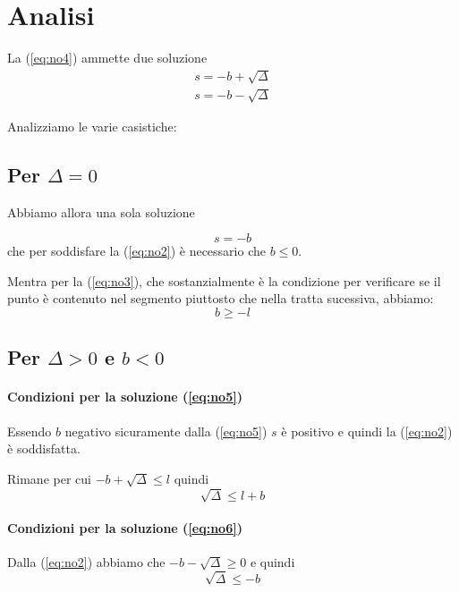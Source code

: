 \section{Analisi}

La (\ref{eq:no4}) ammette due soluzione
\begin{eqnarray}
  \label{eq:no5}
  s=-b+\sqrt\Delta
  \\
  \label{eq:no6}
  s=-b-\sqrt\Delta
\end{eqnarray}

Analizziamo le varie casistiche:

\subsection{Per $\Delta=0$}

Abbiamo allora una sola soluzione

\begin{equation}
  s=-b
\end{equation}
che per soddisfare la (\ref{eq:no2}) \`e necessario che $b \le 0$.

Mentra per la (\ref{eq:no3}), che sostanzialmente \`e la condizione per
verificare se il punto \`e contenuto nel segmento piuttosto che nella tratta
sucessiva, abbiamo:
\begin{equation}
  b\ge-l
\end{equation}

\subsection{Per $\Delta>0$ e $b<0$}

\paragraph{Condizioni per la soluzione (\ref{eq:no5})}
Essendo $b$ negativo sicuramente dalla (\ref{eq:no5}) $s$ \`e positivo e
quindi la (\ref{eq:no2}) \`e soddisfatta.

Rimane per cui $-b+\sqrt\Delta\le l$ quindi
\begin{equation}
  \sqrt\Delta\le l+b
\end{equation}

\paragraph{Condizioni per la soluzione (\ref{eq:no6})}

Dalla (\ref{eq:no2}) abbiamo che $-b-\sqrt\Delta\ge 0$ e quindi
\begin{displaymath}
  \sqrt\Delta\le -b    
\end{displaymath}

